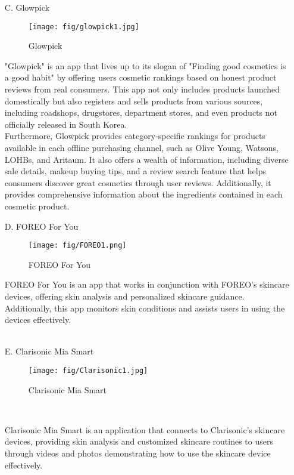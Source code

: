 \documentclass[conference]{IEEEtran}
\begin{document}
\begin{enumerate}
\\
\item[C. ] Glowpick
\begin{figure} [h]
    \centering
    \texttt{[image: fig/glowpick1.jpg]}
    \caption{Glowpick}
\end{figure}
\item[] "Glowpick" is an app that lives up to its slogan of "Finding good cosmetics is a good habit" by offering users cosmetic rankings based on honest product reviews from real consumers. This app not only includes products launched domestically but also registers and sells products from various sources, including roadshops, drugstores, department stores, and even products not officially released in South Korea.\\Furthermore, Glowpick provides category-specific rankings for products available in each offline purchasing channel, such as Olive Young, Watsons, LOHBs, and Aritaum. It also offers a wealth of information, including diverse sale details, makeup buying tips, and a review search feature that helps consumers discover great cosmetics through user reviews. Additionally, it provides comprehensive information about the ingredients contained in each cosmetic product.
\clearpage

\item[D. ] FOREO For You
\begin{figure} [h]
    \centering
    \texttt{[image: fig/FOREO1.png]}
    
    \caption{FOREO For You}
\end{figure}
\item[] FOREO For You is an app that works in conjunction with FOREO's skincare devices, offering skin analysis and personalized skincare guidance. Additionally, this app monitors skin conditions and assists users in using the devices effectively.
\\
\\

\item[E. ] Clarisonic Mia Smart
\begin{figure} [h]
    \texttt{[image: fig/Clarisonic1.jpg]}
    \caption{Clarisonic Mia Smart}
\end{figure}
\\
\item[] Clarisonic Mia Smart is an application that connects to Clarisonic's skincare devices, providing skin analysis and customized skincare routines to users through videos and photos demonstrating how to use the skincare device effectively.

\end{enumerate}
\\
\end{document}
